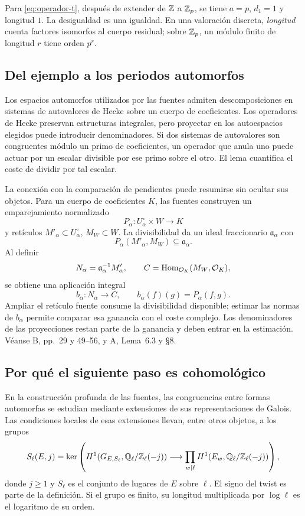 Para \eqref{eq:operador-t}, después de extender de $\mathbb{Z}$ a $\mathbb{Z}_p$, se
tiene $a=p$, $d_1=1$ y longitud $1$. La desigualdad es una igualdad.
En una valoración discreta, \emph{longitud} cuenta factores isomorfos al
cuerpo residual; sobre $\mathbb{Z}_p$, un módulo finito de longitud $r$ tiene
orden $p^r$.

\subsection{Del ejemplo a los periodos automorfos}

Los espacios automorfos utilizados por las fuentes admiten descomposiciones
en sistemas de autovalores de Hecke sobre un cuerpo de coeficientes.
Los operadores de Hecke preservan estructuras integrales, pero proyectar
en los autoespacios elegidos puede introducir denominadores. Si dos
sistemas de autovalores son congruentes módulo un primo de coeficientes,
un operador que anula uno puede actuar por un escalar divisible por ese
primo sobre el otro. El lema cuantifica el coste de dividir por tal escalar.

La conexión con la comparación de pendientes puede resumirse sin ocultar
sus objetos. Para un cuerpo de coeficientes $K$, las fuentes construyen
un emparejamiento normalizado
\[
 P_\alpha:U_\alpha^\circ\times W\longrightarrow K
\]
y retículos $M'_\alpha\subset U_\alpha^\circ$, $M_W\subset W$.
La divisibilidad da un ideal fraccionario $\mathfrak a_\alpha$ con
\[
 P_\alpha(M'_\alpha,M_W)\subseteq\mathfrak a_\alpha.
\]
Al definir
\[
 N_\alpha=\mathfrak a_\alpha^{-1}M'_\alpha,
 \qquad C=\operatorname{Hom}_{\mathcal{O}_K}(M_W,\mathcal{O}_K),
\]
se obtiene una aplicación integral
\[
 b_\alpha:N_\alpha\longrightarrow C,
 \qquad b_\alpha(f)(g)=P_\alpha(f,g).
\]
Ampliar el retículo fuente consume la divisibilidad disponible; estimar
las normas de $b_\alpha$ permite comparar esa ganancia con el coste
complejo. Los denominadores de las proyecciones restan parte de la ganancia
y deben entrar en la estimación. Véanse B, pp.~29 y 49--56, y A,
Lema~6.3 y §8.

\subsection{Por qué el siguiente paso es cohomológico}

En la construcción profunda de las fuentes, las congruencias entre formas
automorfas se estudian mediante extensiones de sus representaciones de
Galois. Las condiciones locales de esas extensiones llevan, entre otros
objetos, a los grupos
\begin{equation}
 S_\ell(E,j)=\ker\left(
 H^1(G_{E,S_\ell},\mathbb{Q}_\ell/\mathbb{Z}_\ell(-j))
 \longrightarrow\prod_{w\mid\ell}
 H^1(E_w,\mathbb{Q}_\ell/\mathbb{Z}_\ell(-j))\right),
 \label{eq:grupo-selmer}
\end{equation}
donde $j\ge1$ y $S_\ell$ es el conjunto de lugares de $E$ sobre $\ell$.
El signo del twist es parte de la definición. Si el grupo es finito, su
longitud multiplicada por $\log\ell$ es el logaritmo de su orden.

